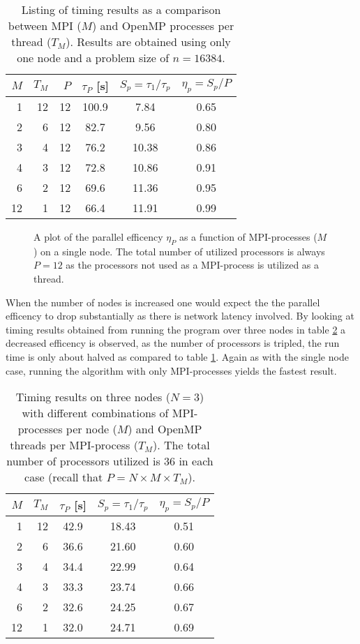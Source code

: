 \documentclass[11pt,a4paper,english]{article}
\numberwithin{figure}{subsection}
\numberwithin{table}{subsection}
\begin{document}
\begin{table}[htbp]
	\centering
	\caption{Listing of timing results as a comparison between MPI ($M$) and OpenMP processes per thread ($T_M$). Results are obtained using only one node and a problem size of $n=16384$.}
	\label{tab:MPIspeedup}
	\begin{tabular}{r|r|r|c|c|c}
	$M$	&	$T_M$	&	$P$	&	$\tau_P$ [s] & $S_p=\tau_1/\tau_p$	&	$\eta_p=S_p/P$	\\
\hline
	1&	12&	12&	100.9&	7.84&	0.65\\
	2&	6&	12&	82.7&	9.56&	0.80\\
	3&	4&	12&	76.2&	10.38&	0.86\\
	4&	3&	12&	72.8&	10.86&	0.91\\
	6&	2&	12&	69.6&	11.36&	0.95\\
	12&	1&	12&	66.4&	11.91&	0.99\\
	\end{tabular}
\end{table}

\begin{figure}[htbp]
	\centering
	
	\caption{A plot of the parallel efficency $\eta_P$ as a function of MPI-processes ($M$) on a single node. The total number of utilized processors is always $P=12$ as the processors not used as a MPI-process is utilized as a thread.}
	\label{fig:MPIspeedup}
\end{figure}

When the number of nodes is increased one would expect the the parallel efficency to drop substantially as there is network latency involved. By looking at timing results obtained from running the program over three nodes in table \ref{tab:nodes} a decreased efficency is observed, as the number of processors is tripled, the run time is only about halved as compared to table \ref{tab:MPIspeedup}. Again as with the single node case, running the algorithm with only MPI-processes yields the fastest result.

\begin{table}[htbp]
	\label{tab:nodes}
	\caption{Timing results on three nodes ($N=3$) with different combinations of MPI-processes per node ($M$) and OpenMP threads per MPI-process ($T_M$). The total number of processors utilized is 36 in each case (recall that $P=N\times M\times T_M$).}
	\centering
	\begin{tabular}{r|r|c|c|c}
	$M$	&	$T_M$	&	$\tau_P$ [s] & $S_p=\tau_1/\tau_p$	&	$\eta_p=S_p/P$	\\
\hline
	1	&12	&42.9	&18.43	&0.51\\
	2	&6	&36.6	&21.60	&0.60\\
	3	&4	&34.4	&22.99	&0.64\\
	4	&3	&33.3	&23.74	&0.66\\
	6	&2	&32.6	&24.25	&0.67\\
	12	&1	&32.0	&24.71	&0.69\\
	\end{tabular}
\end{table}
\end{document}
